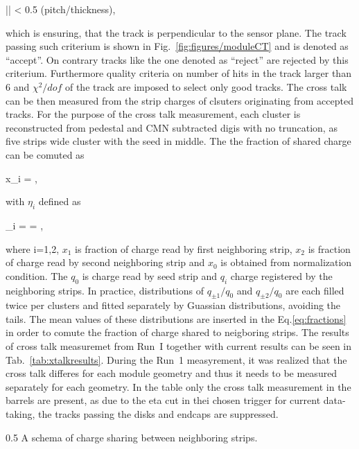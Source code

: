 {
|\theta {}\phi| < 0.5 \times (pitch/thickness),
}

which is ensuring, that the track is perpendicular to the sensor plane. The track passing such criterium is shown in Fig.~\ref{fig:figures/moduleCT} and is denoted as ``accept''. On contrary tracks like the one denoted as ``reject'' are rejected by this criterium. Furthermore quality criteria on number of hits in the track larger than 6 and $\chi^{2}/dof$ of the track are imposed to select only good tracks. The cross talk can be then measured from the strip charges of clsuters originating from accepted tracks. For the purpose of the cross talk measurement, each cluster is reconstructed from pedestal and CMN subtracted digis with no truncation, as five strips wide cluster with the seed in middle. The the fraction of shared charge can be comuted as


{
x_{i} =  ,
}

with $\eta_{i}$ defined as

{
\eta_{i} =  =  ,
}

where i=1,2, $x_{1}$ is fraction of charge read by first neighboring strip,  $x_{2}$ is fraction of charge read by second neighboring strip and $x_{0}$ is obtained from normalization condition. The $q_{0}$ is charge read by seed strip and $q_{i}$ charge registered by the neighboring strips. In practice, distributions of $q_{\pm 1}/q_{0}$ and $q_{\pm 2}/q_{0}$ are each filled twice per clusters and  fitted separately by Guassian distributions, avoiding the tails. The mean values of these distributions are inserted in the Eq.\ref{eq:fractions} in order to comute the fraction of charge shared to neigboring strips. The results of cross talk measuremet from Run~I together with current results can be seen in Tab.~\ref{tab:xtalkresults}. During the Run~1 measyrement, it was realized that the cross talk differes for each module geometry and thus it needs to be measured separately for each geometry. In the table only the cross talk measurement in the barrels are present, as due to the eta cut in thei chosen trigger for current data-taking, the tracks passing the disks and endcaps are suppressed. 

                 {0.5}       %
                 { A schema of charge sharing between neighboring strips. }

